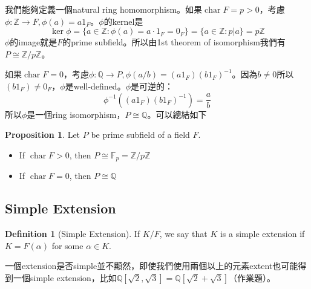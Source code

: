 \documentclass{article}
\theoremstyle{definition}
\newtheorem{dfn}{Definition}
\newtheorem{prop}{Proposition}
\newenvironment{proofs}[1][\proofname]{%
  \begin{proof}[#1]$ $\par\nobreak\ignorespaces
}{%
  \end{proof}
}
\newcommand{\FF}{\mathbb F}
\newcommand{\QQ}{\mathbb Q}
\newcommand{\ZZ}{\mathbb Z}
\DeclareMathOperator{\Char}{char}
\begin{document}
我們能夠定義一個natural ring homomorphism。如果$\Char F = p > 0 $，考慮$\phi:\ZZ\to F, \phi(a)=a1_F$。$\phi$的kernel是
\[
	\ker \phi = \{a\in\ZZ: \phi(a)=a\cdot 1_F =0_F\}=\{a\in \ZZ: p|a\}=p\ZZ
\]
$\phi$的image就是$F$的prime subfield。所以由1st theorem of isomorphism我們有$P\cong \ZZ/p\ZZ$。

如果$\Char F = 0 $，考慮$\phi:\QQ\to P, \phi(a/b)=(a1_F)(b1_F)^{-1}$。因為$b\neq0$所以$(b1_F)\neq 0_F$，$\phi$是well-defined。$\phi$是可逆的：
\[
	\phi^{-1}((a1_F)(b1_F)^{-1})=\frac{a}{b}
\]
所以$\phi$是一個ring isomorphism，$P\cong \QQ$。可以總結如下

\begin{prop}
	Let $P$ be prime subfield of a field $F$.
	\begin{itemize}
		\item If $\Char F>0$, then $P\cong \FF_p = \ZZ/p\ZZ$
		\item If $\Char F=0$, then $P\cong \QQ$
	\end{itemize}
\end{prop}











\subsection{Simple Extension}

\begin{dfn}[Simple Extension]
	If $K/F$, we say that $K$ is a simple extension if $K=F(\alpha)$ for some $\alpha \in K$.
\end{dfn}
一個extension是否simple並不顯然，即使我們使用兩個以上的元素extent也可能得到一個simple extension，比如$\QQ[\sqrt{2},\sqrt{3}]=\QQ[\sqrt{2}+\sqrt{3}]$（作業題）。
\end{document}
